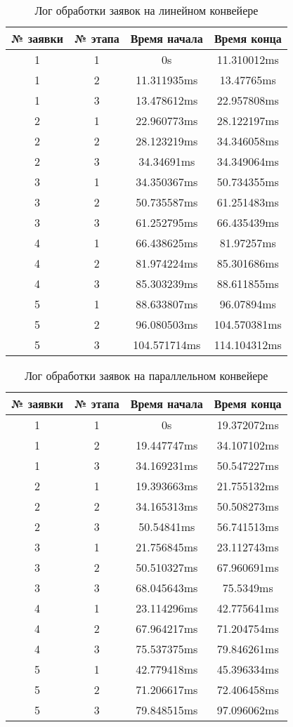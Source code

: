 \begin{table}[h]
	\begin{center}
		\caption{Лог обработки заявок на линейном конвейере}
		\label{tbl:l_time}
		\begin{tabular}{|c|c|c|c|}
			\hline
			№ заявки&№ этапа&Время начала&Время конца \\ \hline
 1&1&0s&11.310012ms\\  1&2&11.311935ms&13.47765ms\\  1&3&13.478612ms&22.957808ms\\ \hline 2&1&22.960773ms&28.122197ms\\  2&2&28.123219ms&34.346058ms\\  2&3&34.34691ms&34.349064ms\\ \hline 3&1&34.350367ms&50.734355ms\\  3&2&50.735587ms&61.251483ms\\  3&3&61.252795ms&66.435439ms\\ \hline 4&1&66.438625ms&81.97257ms\\  4&2&81.974224ms&85.301686ms\\  4&3&85.303239ms&88.611855ms\\ \hline 5&1&88.633807ms&96.07894ms\\  5&2&96.080503ms&104.570381ms\\  5&3&104.571714ms&114.104312ms\\ \hline
		\end{tabular}
	\end{center}
\end{table}
\clearpage

\begin{table}[h]
	\begin{center}
		\caption{Лог обработки заявок на параллельном конвейере}
		\label{tbl:p_time}
		\begin{tabular}{|c|c|c|c|}
			\hline
			№ заявки&№ этапа&Время начала&Время конца \\ \hline
			 1&1&0s&19.372072ms\\  1&2&19.447747ms&34.107102ms\\  1&3&34.169231ms&50.547227ms\\ \hline 2&1&19.393663ms&21.755132ms\\  2&2&34.165313ms&50.508273ms\\  2&3&50.54841ms&56.741513ms\\ \hline 3&1&21.756845ms&23.112743ms\\  3&2&50.510327ms&67.960691ms\\  3&3&68.045643ms&75.5349ms\\ \hline 4&1&23.114296ms&42.775641ms\\  4&2&67.964217ms&71.204754ms\\  4&3&75.537375ms&79.846261ms\\ \hline 5&1&42.779418ms&45.396334ms\\  5&2&71.206617ms&72.406458ms\\  5&3&79.848515ms&97.096062ms\\ \hline
		\end{tabular}
	\end{center}
\end{table}



